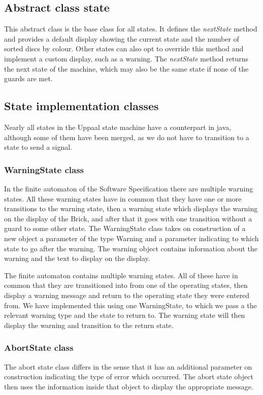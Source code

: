 \documentclass[a4paper,oneside,11pt]{article}
\begin{document}
\subsection{Abstract class state}
This abstract class is the base class for all states. It defines the \emph{nextState} method and provides a default display showing the current state and the number of sorted discs by colour. Other states can also opt to override this method and implement a custom display, such as a warning. The \emph{nextState} method returns the next state of the machine, which may also be the same state if none of the guards are met.

\subsection{State implementation classes}
Nearly all states in the Uppaal state machine have a counterpart in java, although some of them have been merged, as we do not have to transition to a state to send a signal.

\subsubsection{WarningState class}
In the finite automaton of the Software Specification there are multiple warning states. All these warning states have in common that they have one or more transitions to the warning state, then a warning state which displays the warning on the display of the Brick, and after that it goes with one transition without a guard to some other state. The WarningState class takes on construction of a new object a parameter of the type Warning and a parameter indicating to which state to go after the warning. The warning object contains information about the warning and the text to display on the display.

The finite automaton contains multiple warning states. All of these have in common that they are transitioned into from one of the operating states, then display a warning message and return to the operating state they were entered from. We have implemented this using one WarningState, to which we pass a the relevant warning type and the state to return to. The warning state will then display the warning and transition to the return state.

\subsubsection{AbortState class}
The abort state class differs in the sense that it has an additional parameter on construction indicating the type of error which occurred. The abort state object then uses the information inside that object to display the appropriate message.
\end{document}
